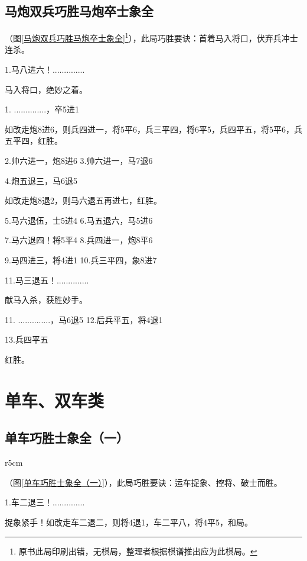 \documentclass[UTF8]{ctexbook}
\newcommand{\rc}[2]{\piece{#1}{#2}{r}} \newcommand{\bc}[2]{\piece{#1}{#2}{R}}
\newcommand{\rj}[2]{\piece{#1}{#2}{k}} \newcommand{\bj}[2]{\piece{#1}{#2}{K}}
\begin{document}
\subsection{马炮双兵巧胜马炮卒士象全}
（图\ref{马炮双兵巧胜马炮卒士象全}\footnote{原书此局印刷出错，无棋局，整理者根据棋谱推出应为此棋局。}），此局巧胜要诀：首着马入将口，伏弃兵冲士连杀。

1.马八进六！..............

马入将口，绝妙之着。

1. ..............，卒5进1

如改走炮8进6，则兵四进一，将5平6，兵三平四，将6平5，兵四平五，将5平6，兵五平四，红胜。

2.帅六进一，炮8进6 \qquad 3.帅六进一，马7退6

4.炮五退三，马6退5

如改走炮8退2，则马六退五再进七，红胜。

5.马六退伍，士5进4 \qquad 6.马五退六，马5进6

7.马六退四！将5平4 \qquad 8.兵四进一，炮8平6

9.马四进三，将4进1 \qquad 10.兵三平四，象8进7

11.马三退五！..............

献马入杀，获胜妙手。

11. ..............，马6退5 \qquad 12.后兵平五，将4退1

13.兵四平五

红胜。

\section{单车、双车类}
\subsection{单车巧胜士象全（一）}
\begin{wrapfigure}{r}{5cm}
\centering
\vspace{-1.5cm}
\smallboard
\begin{position}
\rj{d}{1} \rc{h}{9}

\bj{d}{9}    
\end{position}
\caption{}\label{单车巧胜士象全（一）} 
\end{wrapfigure}
（图\ref{单车巧胜士象全（一）}），此局巧胜要诀：运车捉象、控将、破士而胜。

1.车二退三！..............

捉象紧手！如改走车二退二，则将4退1，车二平八，将4平5，和局。
\end{document}
